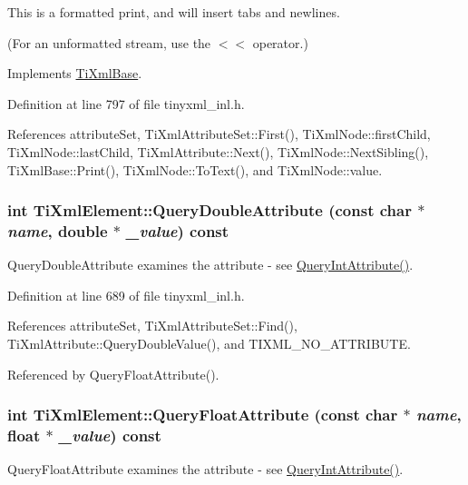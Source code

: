 This is a formatted print, and will insert tabs and newlines.

(For an unformatted stream, use the $<$$<$ operator.) 

Implements \hyperlink{class_ti_xml_base_a0de56b3f2ef14c65091a3b916437b512}{TiXmlBase}.

Definition at line 797 of file tinyxml\_\-inl.h.

References attributeSet, TiXmlAttributeSet::First(), TiXmlNode::firstChild, TiXmlNode::lastChild, TiXmlAttribute::Next(), TiXmlNode::NextSibling(), TiXmlBase::Print(), TiXmlNode::ToText(), and TiXmlNode::value.\hypertarget{class_ti_xml_element_a898d7730ecc341f0bffc7a9dadbf1ce7}{
\subsubsection[{QueryDoubleAttribute}]{\setlength{\rightskip}{0pt plus 5cm}int TiXmlElement::QueryDoubleAttribute (const char $\ast$ {\em name}, \/  double $\ast$ {\em \_\-value}) const}}
\label{class_ti_xml_element_a898d7730ecc341f0bffc7a9dadbf1ce7}


QueryDoubleAttribute examines the attribute -\/ see \hyperlink{class_ti_xml_element_aea0bfe471380f281c5945770ddbf52b9}{QueryIntAttribute()}. 

Definition at line 689 of file tinyxml\_\-inl.h.

References attributeSet, TiXmlAttributeSet::Find(), TiXmlAttribute::QueryDoubleValue(), and TIXML\_\-NO\_\-ATTRIBUTE.

Referenced by QueryFloatAttribute().\hypertarget{class_ti_xml_element_aa04d3af11601ef5a5f88295203a843be}{
\subsubsection[{QueryFloatAttribute}]{\setlength{\rightskip}{0pt plus 5cm}int TiXmlElement::QueryFloatAttribute (const char $\ast$ {\em name}, \/  float $\ast$ {\em \_\-value}) const}}
\label{class_ti_xml_element_aa04d3af11601ef5a5f88295203a843be}


QueryFloatAttribute examines the attribute -\/ see \hyperlink{class_ti_xml_element_aea0bfe471380f281c5945770ddbf52b9}{QueryIntAttribute()}. 

